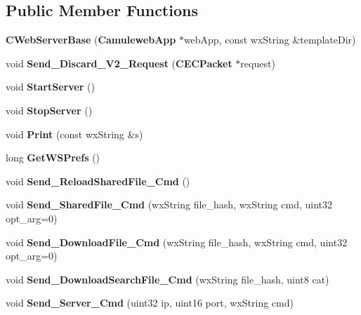 \subsection*{Public Member Functions}
\begin{DoxyCompactItemize}
\item 
{\bfseries CWebServerBase} ({\bf CamulewebApp} $\ast$webApp, const wxString \&templateDir)\label{classCWebServerBase_aa10dfd5d638c457575b5452b93749722}

\item 
void {\bfseries Send\_\-Discard\_\-V2\_\-Request} ({\bf CECPacket} $\ast$request)\label{classCWebServerBase_af715dfef02319ae0a9cc2f583ca2816b}

\item 
void {\bfseries StartServer} ()\label{classCWebServerBase_a4e3d7d9eb8d2810b2a71d8d6314ce274}

\item 
void {\bfseries StopServer} ()\label{classCWebServerBase_a23e000923dec92f9c8d1594b0dd93b7e}

\item 
void {\bfseries Print} (const wxString \&s)\label{classCWebServerBase_a4158f03358cd2e28683ef57133c2e2d2}

\item 
long {\bfseries GetWSPrefs} ()\label{classCWebServerBase_a23ea63bf56f2996c3f83e9aef5bb0b86}

\item 
void {\bfseries Send\_\-ReloadSharedFile\_\-Cmd} ()\label{classCWebServerBase_a82d4f3f2f61fe045ddda85d49793aa60}

\item 
void {\bfseries Send\_\-SharedFile\_\-Cmd} (wxString file\_\-hash, wxString cmd, uint32 opt\_\-arg=0)\label{classCWebServerBase_a5ca9ffbd8a7b28c98d825e2f19e352bc}

\item 
void {\bfseries Send\_\-DownloadFile\_\-Cmd} (wxString file\_\-hash, wxString cmd, uint32 opt\_\-arg=0)\label{classCWebServerBase_a83c9972a8e2267412958c59b41da325d}

\item 
void {\bfseries Send\_\-DownloadSearchFile\_\-Cmd} (wxString file\_\-hash, uint8 cat)\label{classCWebServerBase_ac8e7feca50bef2147db5d3e72056fd2d}

\item 
void {\bfseries Send\_\-Server\_\-Cmd} (uint32 ip, uint16 port, wxString cmd)\label{classCWebServerBase_a046cf43dcfb32813af61d4b6802424b4}


\end{DoxyCompactItemize}

